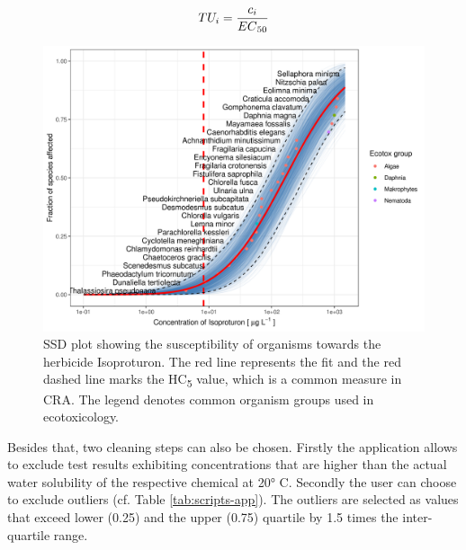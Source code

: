 \begin{equation}
    TU_i = \frac{c_i}{EC\textsubscript{50}}
    \label{eq:tu}
\end{equation}

\begin{figure}[h!]
    \includegraphics[width=1\linewidth]{article/figures/ssd2_boot.png}
    \caption{SSD plot showing the susceptibility of organisms towards the herbicide Isoproturon. The red line represents the fit and the red dashed line marks the HC\textsubscript{5} value, which is a common measure in CRA. The legend denotes common organism groups used in ecotoxicology.}
    \label{fig:ssd-isoproturon}
\end{figure}

Besides that, two cleaning steps can also be chosen. Firstly the application allows to exclude test results exhibiting concentrations that are higher than the actual water solubility of the respective chemical at \ang{20} C. Secondly the user can choose to exclude outliers (cf. Table \ref{tab:scripts-app}). The outliers are selected as values that exceed lower (0.25) and the upper (0.75) quartile by 1.5 times the inter-quartile range.

